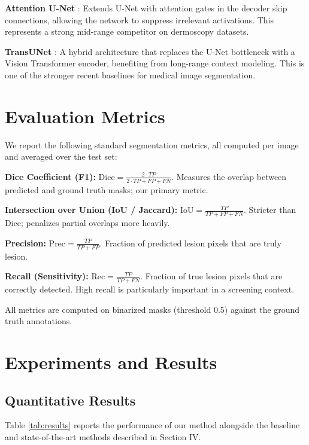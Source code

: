 \documentclass[10pt,journal,compsoc]{IEEEtran}
\begin{document}
\textbf{Attention U-Net} \cite{attunet}: Extends U-Net with attention gates in the decoder skip connections, allowing the network to suppress irrelevant activations. This represents a strong mid-range competitor on dermoscopy datasets.

\textbf{TransUNet} \cite{transunet}: A hybrid architecture that replaces the U-Net bottleneck with a Vision Transformer encoder, benefiting from long-range context modeling. This is one of the stronger recent baselines for medical image segmentation.

\section{Evaluation Metrics}

We report the following standard segmentation metrics, all computed per image and averaged over the test set:

\textbf{Dice Coefficient (F1):} $\text{Dice} = \frac{2 \cdot TP}{2 \cdot TP + FP + FN}$. Measures the overlap between predicted and ground truth masks; our primary metric.

\textbf{Intersection over Union (IoU / Jaccard):} $\text{IoU} = \frac{TP}{TP + FP + FN}$. Stricter than Dice; penalizes partial overlaps more heavily.

\textbf{Precision:} $\text{Prec} = \frac{TP}{TP + FP}$. Fraction of predicted lesion pixels that are truly lesion.

\textbf{Recall (Sensitivity):} $\text{Rec} = \frac{TP}{TP + FN}$. Fraction of true lesion pixels that are correctly detected. High recall is particularly important in a screening context.

All metrics are computed on binarized masks (threshold 0.5) against the ground truth annotations.

\section{Experiments and Results}

\subsection{Quantitative Results}

Table \ref{tab:results} reports the performance of our method alongside the baseline and state-of-the-art methods described in Section IV.
\end{document}
